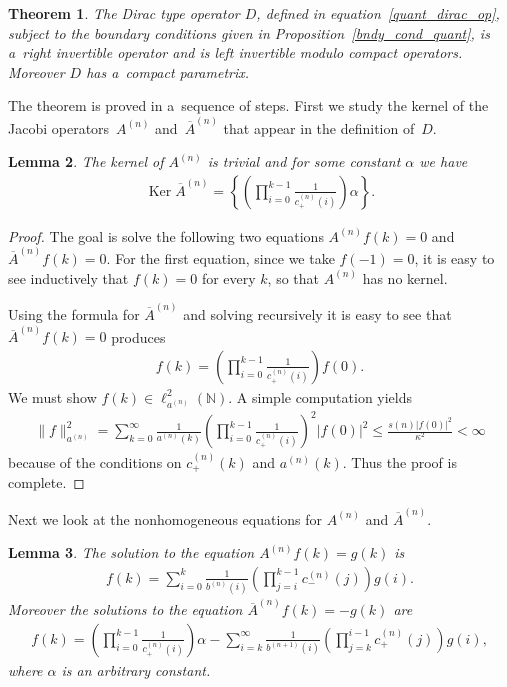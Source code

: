 \documentclass[pdftex]{sigma}
\numberwithin{equation}{section}
\newtheorem{theo}{Theorem}[section]
\newtheorem{lem}[theo]{Lemma}
\DeclareMathOperator{\Ker}{Ker}
\begin{document}
\begin{theo}
\label{compact_para_quant}
The Dirac type operator $D$, defined in equation~\eqref{quant_dirac_op}, subject to the boundary conditions given in
Proposition~{\rm \ref{bndy_cond_quant}}, is a~right invertible operator and is left invertible modulo compact operators.
Moreover $D$ has a~compact parametrix.
\end{theo}

The theorem is proved in a~sequence of steps.
First we study the kernel of the Jacobi opera\-tors~${A}^{(n)}$ and~$\overline{A}^{(n)}$ that appear in the def\/inition of~$D$.
\begin{lem}
\label{A_and_A_bar_ker}
The kernel of $A^{(n)}$ is trivial and for some constant $\alpha$ we have
\begin{gather*}
\Ker \overline{A}^{(n)} = \left\{\left(\prod\limits_{i=0}^{k-1}\frac{1}{c_+^{(n)}(i)}\right)\alpha\right\}.
\end{gather*}
\end{lem}

\begin{proof}
The goal is solve the following two equations $A^{(n)}f(k) = 0$ and $\overline{A}^{(n)}f(k)=0$.
For the f\/irst equation, since we take $f(-1)=0$, it is easy to see inductively that $f(k)=0$ for every $k$, so that
$A^{(n)}$ has no kernel.

Using the formula for $\overline{A}^{(n)}$ and solving recursively it is easy to see that $\overline{A}^{(n)}f(k)=0$
produces
\begin{gather*}
f(k) = \left(\prod\limits_{i=0}^{k-1}\frac{1}{c_+^{(n)}(i)}\right)f(0).
\end{gather*}
We must show ${f(k)}\in \ell_{a^{(n)}}^2({\mathbb N})$.
A simple computation yields
\begin{gather*}
\|f\|_{a^{(n)}}^2 = \sum\limits_{k=0}^{\infty}
\frac{1}{a^{(n)}(k)}\left(\prod\limits_{i=0}^{k-1}\frac{1}{c_+^{(n)}(i)}\right)^2|f(0)|^2
\leq\frac{s(n)|f(0)|^2}{\kappa^2} < \infty
\end{gather*}
because of the conditions on $c_+^{(n)}(k)$ and $a^{(n)}(k)$.
Thus the proof is complete.
\end{proof}
Next we look at the nonhomogeneous equations for $A^{(n)}$ and $\overline{A}^{(n)}$.

\begin{lem}
\label{A_and_A_bar_gen_soln}
The solution to the equation $A^{(n)}f(k) = g(k)$ is
\begin{gather*}
f(k) = \sum\limits_{i=0}^k\frac{1}{b^{(n)}(i)}\left(\prod\limits_{j=i}^{k-1}c_-^{(n)}(j)\right)g(i).
\end{gather*}
Moreover the solutions to the equation $\overline{A}^{(n)}f(k) = -g(k)$ are
\begin{gather*}
f(k) = \left(\prod\limits_{i=0}^{k-1}\frac{1}{c_+^{(n)}(i)}\right)\alpha - \sum\limits_{i=k}^\infty
\frac{1}{b^{(n+1)}(i)}\left(\prod\limits_{j=k}^{i-1}c_+^{(n)}(j)\right)g(i),
\end{gather*}
where $\alpha$ is an arbitrary constant.
\end{lem}
\end{document}
